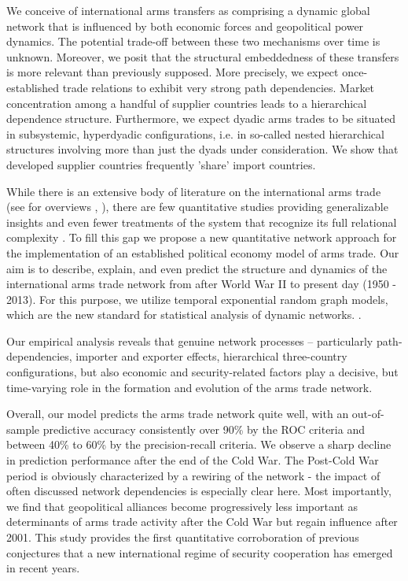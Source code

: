 \documentclass[12pt, letterpaper]{article}
\numberwithin{equation}{section}
\begin{document}
We conceive of international arms transfers as comprising a dynamic global network that is influenced by both economic forces and geopolitical power dynamics. The potential trade-off between these two mechanisms over time is unknown. Moreover, we posit that the structural embeddedness of these transfers is more relevant than previously supposed. More precisely, we expect once-established trade relations to exhibit very strong path dependencies. Market concentration among a handful of supplier countries leads to a hierarchical dependence structure. Furthermore, we expect dyadic arms trades to be situated in subsystemic, hyperdyadic configurations, i.e. in so-called nested hierarchical structures involving more than just the dyads under consideration. We show that developed supplier countries frequently 'share' import countries. 
  
While there is an extensive body of literature on the international arms trade (see for overviews \cite{Krau:92}, \cite{GarcLevi:07}), there are few quantitative studies providing generalizable insights and even fewer treatments of the system that recognize its full relational complexity \citep{AkerSeim:14, Kinne:2016}. To fill this gap we propose a new quantitative network approach for the implementation of an established political economy model of arms trade.
Our aim is to describe, explain, and even predict the structure and dynamics of the international arms trade network from after World War II to present day (1950 - 2013). For this purpose, we utilize temporal exponential random graph models, which are the new standard for statistical analysis of dynamic networks. \citep{HaFuXi:10, Rtergm, LeiCraDes:17}.

Our empirical analysis reveals that genuine network processes -- particularly path-dependencies, importer and exporter effects, hierarchical three-country configurations, but also economic and security-related factors play a decisive, but time-varying role in the formation and evolution of the arms trade network. 
 
Overall, our model predicts the arms trade network quite well, with an out-of-sample predictive accuracy consistently over 90\% by the ROC criteria and between 40\% to 60\% by the precision-recall criteria. We observe a sharp decline in prediction performance after the end of the Cold War. The Post-Cold War  period is obviously characterized by a rewiring of the network -  the impact of often discussed network dependencies is especially clear here.    
Most importantly, we find that geopolitical alliances become progressively less important as determinants of arms trade activity after the Cold War but regain influence after 2001. This study provides the first quantitative corroboration of previous conjectures that a new international regime of security cooperation has emerged in recent years. 
\end{document}
